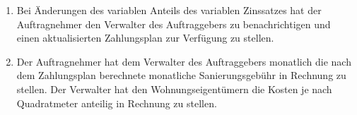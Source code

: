 \begin{enumerate}
\item{Bei Änderungen des variablen Anteils des variablen Zinssatzes hat der Auftragnehmer den Verwalter des Auftraggebers zu benachrichtigen und einen aktualisierten Zahlungsplan zur Verfügung zu stellen.}
\item{Der Auftragnehmer hat dem Verwalter des Auftraggebers monatlich die nach dem Zahlungsplan berechnete monatliche Sanierungsgebühr in Rechnung zu stellen. Der Verwalter hat den Wohnungseigentümern die Kosten je nach Quadratmeter anteilig in Rechnung zu stellen.}

\end{enumerate}
